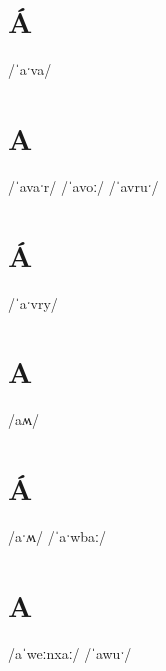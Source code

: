 \documentclass[10pt,a4paper,twoside]{book}
\begin{document}
\section*{Á}

\begin{multicols}{3}
 {/ˈaˑva/} {}
\end{multicols}

\section*{A}

\begin{multicols}{3}
 {/ˈavaˑr/} {}
 {/ˈavoː/} {}
 {/ˈavruˑ/} {}
\end{multicols}

\section*{Á}

\begin{multicols}{3}
 {/ˈaˑvry/} {}
\end{multicols}

\section*{A}

\begin{multicols}{3}
 {/aʍ/} {}
\end{multicols}

\section*{Á}

\begin{multicols}{3}
 {/aˑʍ/} {}
 {/ˈaˑwbaː/} {}
\end{multicols}

\section*{A}

\begin{multicols}{3}
 {/aˈweːnxaː/} {}
 {/ˈawuˑ/} {}
\end{multicols}
\end{document}
